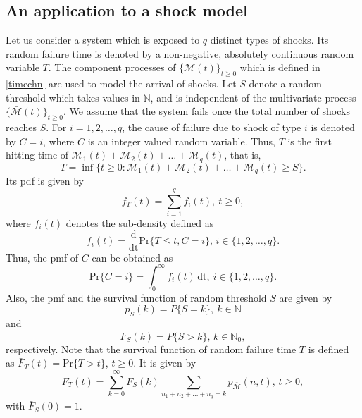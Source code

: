 \documentclass[12pt,oneside,reqno]{amsart}
\numberwithin{equation}{section}
\theoremstyle{definition}
\numberwithin{equation}{section}
\theoremstyle{remarkstyle}
\begin{document}
\subsection{An application to a shock model}
Let us consider a system which is exposed to $q$ distinct types of shocks. Its random failure time is denoted by a non-negative, absolutely continuous random variable $T$. The component processes of $\{\bar{\mathscr{M}}(t)\}_{t\geq0}$ which is defined in \eqref{timechn} are used to model the arrival of shocks. Let $S$ denote a random threshold which takes values in $\mathbb{N}$, and is independent of the multivariate process $\{\bar{\mathscr{M}}(t)\}_{t\geq0}$. We assume that the system fails once the total number of shocks reaches $S$. For $i=1,2,\dots,q$, the cause of failure due to shock of type $i$ is denoted by $C=i$, where $C$ is an integer valued random variable. Thus, $T$ is the first hitting time of $\mathscr{M}_1(t)+\mathscr{M}_2(t)+\dots+\mathscr{M}_q(t)$, that is,
	\begin{equation*}
		T= \inf \{t\geq0 : \mathscr{M}_1(t)+\mathscr{M}_2(t)+\dots+\mathscr{M}_q(t)\ge S\}.
	\end{equation*}
	Its pdf is given by 
	\begin{equation*}
		f_T(t)=\sum_{i=1}^{q}f_i(t),\  t\geq0,
	\end{equation*}
	where $f_i(t)$ denotes the sub-density defined as 
	\begin{equation*}
		f_i(t)=\frac{\mathrm{d}}{\mathrm{dt}} \mathrm{Pr}\{T\leq t, C=i\}, \, i\in\{1,2,\dots,q\}.
	\end{equation*}
	Thus, the pmf of $C$ can be obtained as 
	\begin{equation*}
		\mathrm{Pr}\{C=i\}=\int_{0}^{\infty}f_i(t)\,\mathrm{dt}, \  i\in\{1,2,\dots,q\}.
	\end{equation*}
	Also, the pmf and the survival function of random threshold $S$ are given by
	\begin{equation*}
		p_S(k)=P\{S=k\},\ k\in\mathbb{N}
	\end{equation*} 
	and
	\begin{equation*}
		\bar{F}_S(k)=P\{S>k\},\, k\in\mathbb{N}_0,
	\end{equation*} 
	respectively. Note that the survival function of random failure time $T$ is defined as $\bar{F}_T(t)=\mathrm{Pr}\{T> t\}$, $t\ge 0$. It is given by 
	\begin{equation}\label{surv}
		\bar{F}_T(t)=\sum_{k=0}^{\infty}\bar{F}_S(k)\sum_{n_1+n_2+\dots+n_q=k}p_{\bar{\mathscr{M}}}(\bar{n},t), \, t\geq0,  
	\end{equation}
with $\bar{F}_S(0)=1.$
\end{document}
